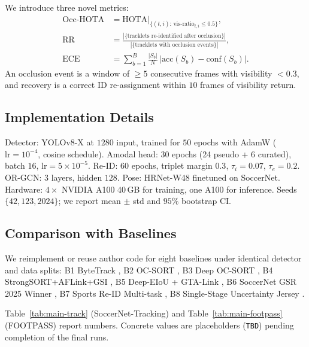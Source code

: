 \documentclass[conference]{IEEEtran}
\begin{document}
We introduce three novel metrics:
\begin{align}
\text{Occ-HOTA} &= \text{HOTA}\big|_{\{(t,i):\, \text{vis-ratio}_{t,i}\leq 0.5\}}, \label{eq:occhota}\\
\text{RR}       &= \frac{|\{\text{tracklets re-identified after occlusion}\}|}{|\{\text{tracklets with occlusion events}\}|}, \label{eq:rr}\\
\text{ECE}      &= \sum_{b=1}^{B} \frac{|S_b|}{N}\,\big|\mathrm{acc}(S_b)-\mathrm{conf}(S_b)\big|. \label{eq:ece}
\end{align}
An occlusion event is a window of $\geq 5$ consecutive frames with visibility $<0.3$, and recovery is a correct ID re-assignment within $10$ frames of visibility return.

\subsection{Implementation Details}
Detector: YOLOv8-X at $1280$ input, trained for $50$ epochs with AdamW ($\text{lr}=10^{-4}$, cosine schedule). Amodal head: $30$ epochs (24 pseudo + 6 curated), batch $16$, $\text{lr}=5\times 10^{-5}$. Re-ID: $60$ epochs, triplet margin $0.3$, $\tau_i=0.07$, $\tau_e=0.2$. OR-GCN: $3$ layers, hidden $128$. Pose: HRNet-W48 finetuned on SoccerNet. Hardware: $4\times$ NVIDIA A100 40\,GB for training, one A100 for inference. Seeds $\{42, 123, 2024\}$; we report mean $\pm$ std and $95\%$ bootstrap CI.

\subsection{Comparison with Baselines}
\label{sec:baselines}

We reimplement or reuse author code for eight baselines under identical detector and data splits: B1 ByteTrack \cite{bytetrack}, B2 OC-SORT \cite{ocsort}, B3 Deep OC-SORT \cite{deepocsort}, B4 StrongSORT+AFLink+GSI \cite{strongsort}, B5 Deep-EIoU + GTA-Link \cite{deepeiou, gtatrack}, B6 SoccerNet GSR 2025 Winner \cite{gsr2025winner}, B7 Sports Re-ID Multi-task \cite{multitaskreid}, B8 Single-Stage Uncertainty Jersey \cite{uncertaintyjersey}.

Table~\ref{tab:main-track} (SoccerNet-Tracking) and Table~\ref{tab:main-footpass} (FOOTPASS) report numbers. Concrete values are placeholders (\texttt{TBD}) pending completion of the final runs.
\end{document}

